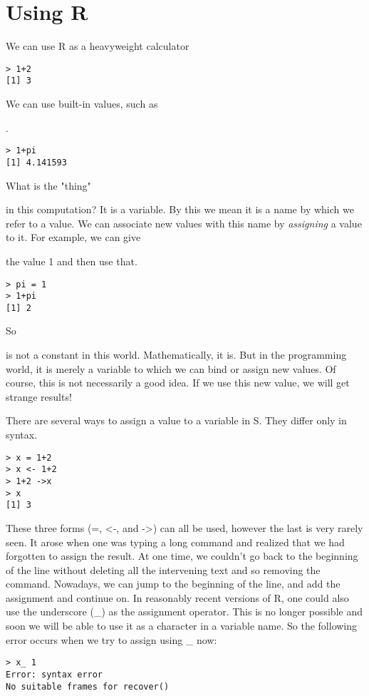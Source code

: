 \section{Using R}
\label{id685581}\hypertarget{id685581}{}%
We can use R as a heavyweight calculator 
\begin{verbatim}
> 1+2
[1] 3
\end{verbatim}
 We can use built-in values, such as {. 
\begin{verbatim}
> 1+pi
[1] 4.141593
\end{verbatim}
 What is the "thing" { in this computation? It is a variable. By this we mean it is a name by which we refer to a value. We can associate new values with this name by {\em{assigning}} a value to it. For example, we can give { the value 1 and then use that. 
\begin{verbatim}
> pi = 1
> 1+pi
[1] 2
\end{verbatim}
 So { is not a constant in this world. Mathematically, it is. But in the programming world, it is merely a variable to which we can bind or assign new values. Of course, this is not necessarily a good idea. If we use this new value, we will get strange results! 

 There are several ways to assign a value to a variable in S. They differ only in syntax. 
\begin{verbatim}
> x = 1+2
> x <- 1+2
> 1+2 ->x
> x
[1] 3
\end{verbatim}
 These three forms (=, \textless{}-, and -\textgreater{}) can all be used, however the last is very rarely seen. It arose when one was typing a long command and realized that we had forgotten to assign the result. At one time, we couldn't go back to the beginning of the line without deleting all the intervening text and so removing the command. Nowadays, we can jump to the beginning of the line, and add the assignment and continue on. In reasonably recent versions of R, one could also use the underscore (\_) as the assignment operator. This is no longer possible and soon we will be able to use it as a character in a variable name. So the following error occurs when we try to assign using \_ now: 
\begin{verbatim}
> x_ 1
Error: syntax error
No suitable frames for recover()
\end{verbatim}


}}}}
